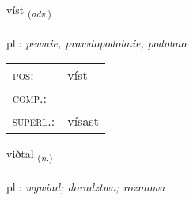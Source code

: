 \documentclass[frontgrid, backgrid]{flacards}\usepackage[]{graphicx}\usepackage[]{xcolor}
\begin{document}
\renewcommand{\flhead}{\vskip5pt \fboxsep=0pt {\small\bfseries\footnotesize Atviksorð | Adverb}}
\renewcommand{\fcfoot}{\vskip5pt \fboxsep=0pt \hspace{2pt}{\small\bfseries\footnotesize 1K}}

\renewcommand{\blhead}{\vskip5pt {\small\bfseries\footnotesize Atviksorð | Adverb }}
\renewcommand{\bcfoot}{\vskip5pt \hspace{2pt}{\small\bfseries\footnotesize 1K}}


{víst \small{\textsubscript{(\textit{adv.})}} \\[1ex] %
\textphonetic{[vist]} \\
pl.: \emph{pewnie, prawdopodobnie, podobno} \\  [2ex]
\renewcommand*{\arraystretch}{0.8}
\begin{tabular}{ll}
\textsc{pos}: & víst \\ 
\textsc{comp.}: &  \\ 
\textsc{superl.}: & vísast \\
\end{tabular}
}

\renewcommand{\flhead}{\vskip5pt \fboxsep=0pt {\small\bfseries\footnotesize Nafnorð | Noun}}
\renewcommand{\fcfoot}{\vskip5pt \fboxsep=0pt \hspace{2pt}{\small\bfseries\footnotesize 1K}}

\renewcommand{\blhead}{\vskip5pt {\small\bfseries\footnotesize Nafnorð | Noun }}
\renewcommand{\bcfoot}{\vskip5pt \hspace{2pt}{\small\bfseries\footnotesize 1K}}


{viðtal \small{\textsubscript{(\textit{n.})}} \\[1ex] %
\textphonetic{[vɪðtʰal]} \\
pl.: \emph{wywiad; doradztwo; rozmowa} \\  [2ex]
\renewcommand*{\arraystretch}{0.8}
}
\end{document}
